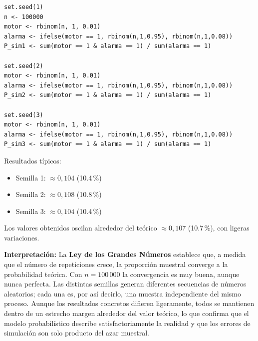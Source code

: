 \documentclass[11pt,letterpaper]{article}
\begin{document}
\begin{verbatim}
set.seed(1)
n <- 100000
motor <- rbinom(n, 1, 0.01)
alarma <- ifelse(motor == 1, rbinom(n,1,0.95), rbinom(n,1,0.08))
P_sim1 <- sum(motor == 1 & alarma == 1) / sum(alarma == 1)

set.seed(2)
motor <- rbinom(n, 1, 0.01)
alarma <- ifelse(motor == 1, rbinom(n,1,0.95), rbinom(n,1,0.08))
P_sim2 <- sum(motor == 1 & alarma == 1) / sum(alarma == 1)

set.seed(3)
motor <- rbinom(n, 1, 0.01)
alarma <- ifelse(motor == 1, rbinom(n,1,0.95), rbinom(n,1,0.08))
P_sim3 <- sum(motor == 1 & alarma == 1) / sum(alarma == 1)
\end{verbatim}

Resultados típicos:
\begin{itemize}
    \item Semilla 1: $\approx 0{,}104$ (10.4\,\%)
    \item Semilla 2: $\approx 0{,}108$ (10.8\,\%)
    \item Semilla 3: $\approx 0{,}104$ (10.4\,\%)
\end{itemize}

Los valores obtenidos oscilan alrededor del teórico $\approx 0{,}107$ (10.7\,\%), con ligeras variaciones.

\textbf{Interpretación:} La \textbf{Ley de los Grandes Números} establece que, a medida que el número de repeticiones crece, la proporción muestral converge a la probabilidad teórica. Con $n = 100\,000$ la convergencia es muy buena, aunque nunca perfecta. Las distintas semillas generan diferentes secuencias de números aleatorios; cada una es, por así decirlo, una muestra independiente del mismo proceso. Aunque los resultados concretos difieren ligeramente, todos se mantienen dentro de un estrecho margen alrededor del valor teórico, lo que confirma que el modelo probabilístico describe satisfactoriamente la realidad y que los errores de simulación son solo producto del azar muestral.
\end{document}
